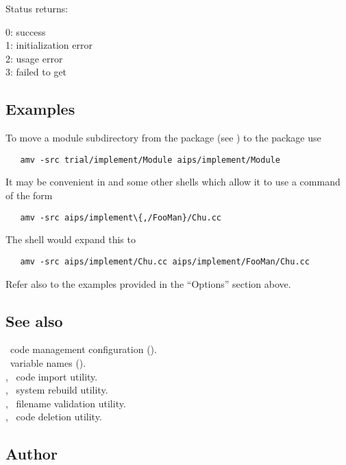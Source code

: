 Status returns:
\begin{status}
   0:  success\\
   1:  initialization error\\
   2:  usage error\\
   3:  failed to get 
\end{status}

\subsection*{Examples}

To move a module subdirectory from the  package (see ) to the  package use

\begin{verbatim}
   amv -src trial/implement/Module aips/implement/Module
\end{verbatim}

\noindent
It may be convenient in  and some other shells which allow it to
use a command of the form

\begin{verbatim}
   amv -src aips/implement\{,/FooMan}/Chu.cc
\end{verbatim}

\noindent
The shell would expand this to

\begin{verbatim}
   amv -src aips/implement/Chu.cc aips/implement/FooMan/Chu.cc
\end{verbatim}

\noindent
Refer also to the examples provided in the ``Options'' section above.

\subsection*{See also}

\aipspp\ code management configuration ().\\
\aipspp\ variable names ().\\
, \aipspp\ code import utility.\\
, \aipspp\ system rebuild utility.\\
, \aipspp\ filename validation utility.\\
, \aipspp\ code deletion utility.

\subsection*{Author}


